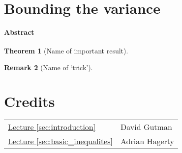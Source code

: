 \documentclass{amsproc}
\newtheorem{theorem}{Theorem}
\newtheorem{remark}[theorem]{Remark}
\newcommand{\fref}[2]{\hyperref[#2]{#1 \ref*{#2}}}
\begin{document}

\section{Bounding the variance}
\label{sec:bound_var}
\paragraph{\textbf{Abstract}}

\begin{theorem}[Name of important result]
\label{thm:reference_name}
\end{theorem}

\begin{remark}[Name of `trick']
\label{rmk:reference_name}
\end{remark}


\appendix
\newpage
\section*{Credits}
\begin{tabular}{ll}
	\fref{Lecture}{sec:introduction}
	&David Gutman
	\\
	\fref{Lecture}{sec:basic_inequalites}
	&Adrian Hagerty
\end{tabular}



\end{document}
